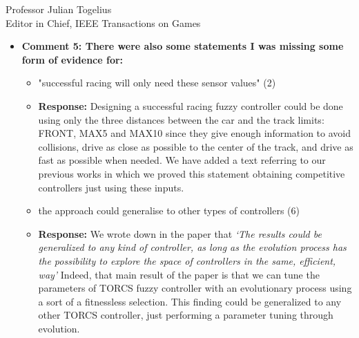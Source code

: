 \documentclass[10pt]{letter} %
\begin{document}
\begin{letter}{Professor Julian Togelius \\ Editor in Chief, IEEE Transactions on Games}
\begin{enumerate}
\begin{itemize}

		\item {\bf   Comment 5: There were also some statements I was missing some form of evidence for:}
			\begin{itemize}
			\item	"successful racing will only need these sensor values" (2)
					\item {\bf Response:} 
					Designing a successful racing fuzzy controller could be done using only the three distances  between the car and the track limits: FRONT, MAX5 and MAX10	since they give enough information to avoid collisions, drive as close as possible to the center of the track, and drive as fast as possible when needed. 
We have added a text referring to our previous works in which we proved this statement obtaining competitive controllers just using these inputs.\\
					
					
			\item	the approach could generalise to other types of controllers (6)
					\item {\bf Response:} 
					We wrote down in the paper that {\em `The results could be generalized to any kind of controller, as long as the evolution process has the possibility to explore the	space of controllers in the same, efficient, way'}
				Indeed, that main result of the paper is that we can tune the parameters of  TORCS fuzzy controller with an evolutionary process  using a sort of a fitnessless selection. This finding could be generalized to any other TORCS controller, just performing a parameter tuning through evolution.\\
				

\end{itemize}
\end{itemize}
\end{enumerate}
\end{letter}
\end{document}
